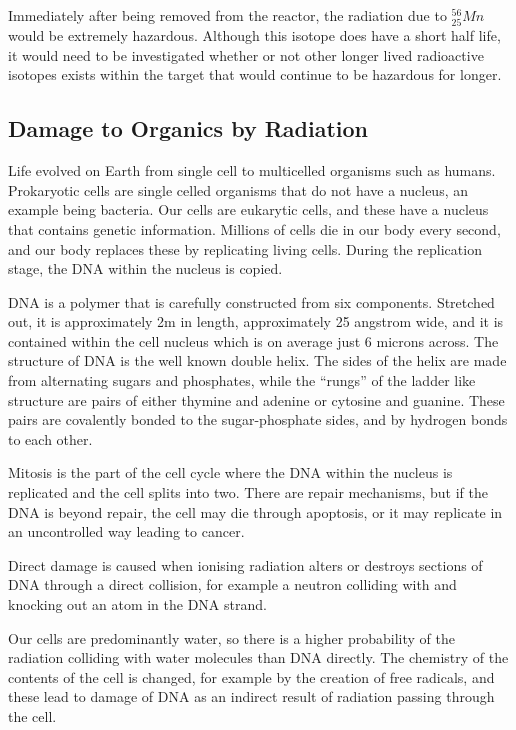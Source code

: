 Immediately after being removed from the reactor, the radiation due to ${}^{56}_{25}Mn$ would be extremely hazardous.  Although this isotope does have a short half life, it would need to be investigated whether or not other longer lived radioactive isotopes exists within the target that would continue to be hazardous for longer.


\FloatBarrier

\subsection{Damage to Organics by Radiation}

Life evolved on Earth from single cell to multicelled organisms such as humans.  Prokaryotic cells are single celled organisms that do not have a nucleus, an example being bacteria.  Our cells are eukarytic cells, and these have a nucleus that contains genetic information.  Millions of cells die in our body every second, and our body replaces these by replicating living cells.  During the replication stage, the DNA within the nucleus is copied.    

DNA is a polymer that is carefully constructed from six components.  Stretched out, it is approximately 2m in length, approximately 25 angstrom wide, and it is contained within the cell nucleus which is on average just 6 microns across.  The structure of DNA is the well known double helix.  The sides of the helix are made from alternating sugars and phosphates, while the \enquote{rungs} of the ladder like structure are pairs of either thymine and adenine or cytosine and guanine.  These pairs are covalently bonded to the sugar-phosphate sides, and by hydrogen bonds to each other.

Mitosis is the part of the cell cycle where the DNA within the nucleus is replicated and the cell splits into two.  There are repair mechanisms, but if the DNA is beyond repair, the cell may die through apoptosis, or it may replicate in an uncontrolled way leading to cancer.

Direct damage is caused when ionising radiation alters or destroys sections of DNA through a direct collision, for example a neutron colliding with and knocking out an atom in the DNA strand.

Our cells are predominantly water, so there is a higher probability of the radiation colliding with water molecules than DNA directly.  The chemistry of the contents of the cell is changed, for example by the creation of free radicals, and these lead to damage of DNA as an indirect result of radiation passing through the cell.

